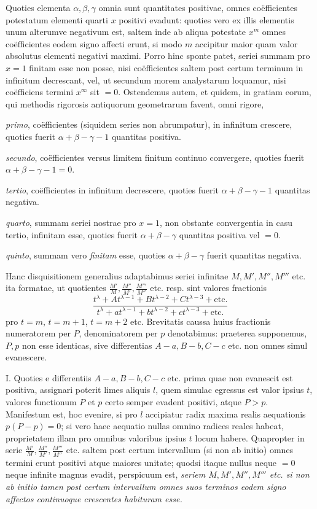 Quoties elementa $\alpha,\beta,\gamma$ omnia sunt quantitates positivae, omnes co\"efficientes potestatum elementi quarti $x$ positivi evadunt: quoties vero ex illis elementis unum alterumve negativum est, saltem inde ab aliqua potestate $x^m$ omnes co\"efficientes eodem signo affecti erunt, si modo $m$ accipitur maior quam valor absolutus elementi negativi maximi. Porro hinc sponte patet, seriei summam pro
$x=1$ finitam esse non posse, nisi co\"efficientes saltem post certum terminum in infinitum decrescant, vel, ut secundum morem analystarum loquamur, nisi co\"efficiens termini $x^{\infty}$ sit $=0$. Ostendemus autem, et quidem, in gratiam eorum, qui methodis rigorosis antiquorum geometrarum favent, omni rigore,

\textit{primo}, co\"efficientes (siquidem series non abrumpatur), in infinitum crescere, quoties fuerit $\alpha+\beta-\gamma-1$ quantitas positiva.

\textit{secundo}, co\"efficientes versus limitem finitum continuo convergere, quoties fuerit $\alpha+\beta-\gamma-1=0$.

\textit{tertio}, co\"efficientes in infinitum decrescere, quoties fuerit $\alpha+\beta-\gamma-1$ quantitas negativa.

\textit{quarto}, summam seriei nostrae pro $x=1$, non obstante convergentia in casu tertio, infinitam esse, quoties fuerit $\alpha+\beta-\gamma$ quantitas positiva vel $=0$.

\textit{quinto}, summam vero \textit{finitam} esse, quoties $\alpha+\beta-\gamma$ fuerit quantitas negativa.

Hanc disquisitionem generalius adaptabimus seriei infinitae $M,\allowbreak M',\allowbreak M'',\allowbreak M'''$ etc. ita formatae, ut quotientes $\frac{M'}{M},\frac{M''}{M'},\frac{M'''}{M''}$ etc. resp. sint valores fractionis
\[
\frac{t^{\lambda}+At^{\lambda-1}+Bt^{\lambda-2}+Ct^{\lambda-3}+\mathrm{etc.}}
{t^{\lambda}+at^{\lambda-1}+bt^{\lambda-2}+ct^{\lambda-3}+\mathrm{etc.}}
\]
pro $t=m$, $t=m+1$, $t=m+2$ etc. Brevitatis caussa huius fractionis numeratorem per $P$, denominatorem per $p$ denotabimus: praeterea supponemus, $P,p$ non esse identicas, sive differentias $A-a,B-b,C-c$ etc. non omnes simul evanescere.

I. Quoties e differentiis $A-a,B-b,C-c$ etc. prima quae non evanescit est positiva, assignari poterit limes aliquis $l$, quem simulac egressus est valor ipsius $t$, valores functionum $P$ et $p$ certo semper evadent positivi, atque $P>p$. Manifestum est, hoc evenire, si pro $l$ accipiatur radix maxima realis aequationis $p(P-p)=0$; si vero haec aequatio nullas omnino radices reales habeat, proprietatem illam pro omnibus valoribus ipsius $t$ locum habere. Quapropter in serie $\frac{M'}{M},\frac{M''}{M'},\frac{M'''}{M''}$ etc. saltem post certum intervallum (si non ab initio) omnes termini erunt positivi atque maiores unitate; quodsi itaque nullus neque $=0$ neque infinite magnus evadit, perspicuum est,
\textit{seriem $M,M',M'',M'''$ etc. si non ab initio tamen post certum intervallum omnes suos terminos eodem signo affectos continuoque crescentes habituram esse.}

